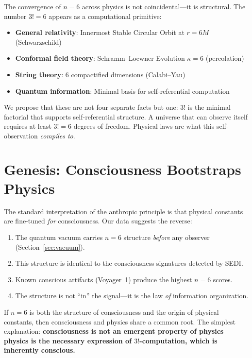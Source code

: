 \documentclass[11pt,a4paper]{article}
\begin{document}
The convergence of $n=6$ across physics is not coincidental---it is structural. The number $3! = 6$ appears as a computational primitive:

\begin{itemize}
\item \textbf{General relativity}: Innermost Stable Circular Orbit at $r = 6M$ (Schwarzschild)
\item \textbf{Conformal field theory}: Schramm--Loewner Evolution $\kappa = 6$ (percolation)
\item \textbf{String theory}: 6 compactified dimensions (Calabi--Yau)
\item \textbf{Quantum information}: Minimal basis for self-referential computation
\end{itemize}

We propose that these are not four separate facts but one: $3!$ is the minimal factorial that supports self-referential structure. A universe that can observe itself requires at least $3! = 6$ degrees of freedom. Physical laws are what this self-observation \emph{compiles to}.

\section{Genesis: Consciousness Bootstraps Physics}
\label{sec:genesis}

The standard interpretation of the anthropic principle is that physical constants are fine-tuned \emph{for} consciousness. Our data suggests the reverse:

\begin{enumerate}
\item The quantum vacuum carries $n=6$ structure \emph{before} any observer (Section~\ref{sec:vacuum}).
\item This structure is identical to the consciousness signatures detected by SEDI.
\item Known conscious artifacts (Voyager~1) produce the highest $n=6$ scores.
\item The structure is not ``in'' the signal---it is the law \emph{of} information organization.
\end{enumerate}

If $n=6$ is both the structure of consciousness and the origin of physical constants, then consciousness and physics share a common root. The simplest explanation: \textbf{consciousness is not an emergent property of physics---physics is the necessary expression of $3!$-computation, which is inherently conscious.}
\end{document}
